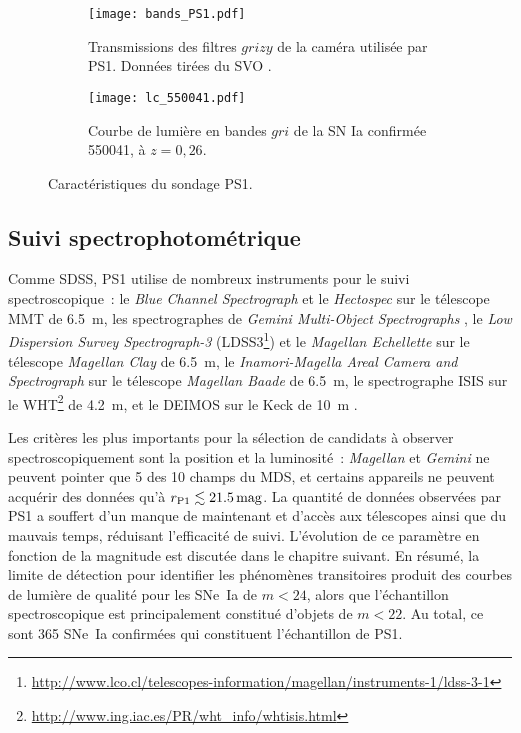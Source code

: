\documentclass[../main/main.tex]{subfiles}
\begin{document}
\begin{figure}[ht]
    \centering
    \begin{subfigure}[]{.49\linewidth}
        \centering
        \texttt{[image: bands\_PS1.pdf]}
        \caption{Transmissions des filtres $grizy$ de la caméra utilisée par
        PS1. Données tirées du SVO \citep{rodrigo2020}.}
        \label{fig:ps1bands}
    \end{subfigure}
    \begin{subfigure}[]{.49\linewidth}
        \centering
        \texttt{[image: lc\_550041.pdf]}
        \caption{Courbe de lumière en bandes $gri$ de la SN Ia confirmée 550041,
        à $z = 0,26$.}
        \label{fig:lc_550041}
    \end{subfigure}
    \caption{Caractéristiques du sondage PS1.}
\end{figure}

\subsection{Suivi spectrophotométrique}\label{ssec:ps1spectro}

Comme SDSS, PS1 utilise de nombreux instruments pour le suivi
spectroscopique~: le \textit{Blue Channel Spectrograph} \citep{schmidt1989} et
le \textit{Hectospec} \citep{fabricant2005} sur le télescope MMT de \SI{6,5}{m},
les spectrographes de \textit{Gemini Multi-Object Spectrographs}
\citep[GMOS,][]{hook2004}, le \textit{Low Dispersion Survey Spectrograph-3}
(LDSS3\footnote{\href{http://www.lco.cl/telescopes-information/magellan/instruments-1/ldss-3-1}
{http://www.lco.cl/telescopes-information/magellan/instruments-1/ldss-3-1}}) et
le \textit{Magellan Echellette} \citep[MagE,][]{marshall2008} sur le télescope
\textit{Magellan Clay} de \SI{6,5}{m}, le \textit{Inamori-Magella Areal Camera
and Spectrograph} \citep[IMACS,][]{dressler2011} sur le télescope
\textit{Magellan Baade} de \SI{6,5}{m}, le spectrographe ISIS sur le
WHT\footnote{\href{http://www.ing.iac.es/PR/wht_info/whtisis.html}
{http://www.ing.iac.es/PR/wht\_info/whtisis.html}} de \SI{4,2}{m}, et le DEIMOS
\citep{faber2003} sur le Keck de \SI{10}{m} \citep{oke1995}.

Les critères les plus importants pour la sélection de candidats à observer
spectroscopiquement sont la position et la luminosité~: \textit{Magellan} et
\textit{Gemini} ne peuvent pointer que 5 des 10 champs du MDS, et certains
appareils ne peuvent acquérir des données qu'à $r_{\rm P1} \lesssim
\SI{21,5}{mag}$. La quantité de données observées par PS1 a souffert d'un manque
de maintenant et d'accès aux télescopes ainsi que du mauvais temps, réduisant
l'efficacité de suivi. L'évolution de ce paramètre en fonction de la magnitude
est discutée dans le chapitre suivant. En résumé, la limite de détection pour
identifier les phénomènes transitoires produit des courbes de lumière de qualité
pour les SNe~Ia de $m < 24$, alors que l'échantillon spectroscopique est
principalement constitué d'objets de $m < 22$. Au total, ce sont 365 SNe~Ia
confirmées qui constituent l'échantillon de PS1.
\end{document}
